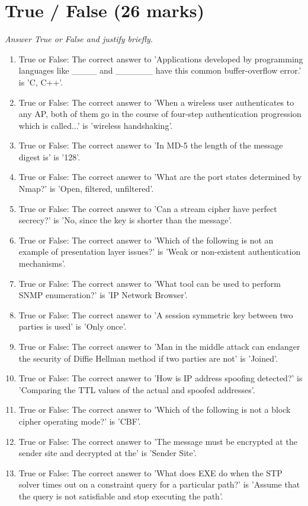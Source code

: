 \documentclass[12pt]{article}
\begin{document}
\section*{True / False (26 marks)}
\textit{Answer True or False and justify briefly.}
\begin{enumerate}[label=\arabic*.]
\item True or False: The correct answer to 'Applications developed by programming languages like \_\_\_\_ and \_\_\_\_\_\_ have this common buffer-overflow error.' is 'C, C++'.
\item True or False: The correct answer to 'When a wireless user authenticates to any AP, both of them go in the course of four-step authentication progression which is called...' is 'wireless handshaking'.
\item True or False: The correct answer to 'In MD-5 the length of the message digest is' is '128'.
\item True or False: The correct answer to 'What are the port states determined by Nmap?' is 'Open, filtered, unfiltered'.
\item True or False: The correct answer to 'Can a stream cipher have perfect secrecy?' is 'No, since the key is shorter than the message'.
\item True or False: The correct answer to 'Which of the following is not an example of presentation layer issues?' is 'Weak or non-existent authentication mechanisms'.
\item True or False: The correct answer to 'What tool can be used to perform SNMP enumeration?' is 'IP Network Browser'.
\item True or False: The correct answer to 'A session symmetric key between two parties is used' is 'Only once'.
\item True or False: The correct answer to 'Man in the middle attack can endanger the security of Diffie Hellman method if two parties are not' is 'Joined'.
\item True or False: The correct answer to 'How is IP address spoofing detected?' is 'Comparing the TTL values of the actual and spoofed addresses'.
\item True or False: The correct answer to 'Which of the following is not a block cipher operating mode?' is 'CBF'.
\item True or False: The correct answer to 'The message must be encrypted at the sender site and decrypted at the' is 'Sender Site'.
\item True or False: The correct answer to 'What does EXE do when the STP solver times out on a constraint query for a particular path?' is 'Assume that the query is not satisfiable and stop executing the path'.
\end{enumerate}
\end{document}
